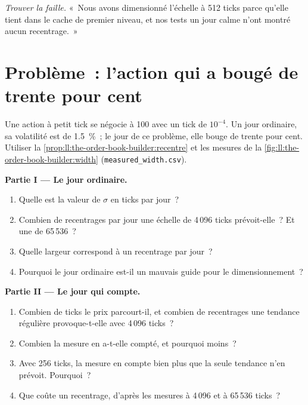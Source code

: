 \begin{exercise}[$\star\star\star$]\label{exo:ll:the-order-book-builder:8}
\emph{Trouver la faille.} «~Nous avons dimensionné l'échelle à 512 ticks parce qu'elle tient dans le cache de premier niveau, et nos tests
un jour calme n'ont montré aucun recentrage.~»
\end{exercise}

\section{Problème~: l'action qui a bougé de trente pour cent}

\begin{problem}\label{pb:ll:the-order-book-builder:1}
Une action à petit tick se négocie à 100 avec un tick de $10^{-4}$. Un jour ordinaire, sa volatilité est de 1.5~\%~; le jour de ce
problème, elle bouge de trente pour cent. Utiliser la \cref{prop:ll:the-order-book-builder:recentre} et les mesures de la
\cref{fig:ll:the-order-book-builder:width} (\texttt{measured\_width.csv}).

\medskip\noindent\textbf{Partie I --- Le jour ordinaire.}
\begin{enumerate}
\item Quelle est la valeur de $\sigma$ en ticks par jour~?
\item Combien de recentrages par jour une échelle de 4\,096 ticks prévoit-elle~? Et une de 65\,536~?
\item Quelle largeur correspond à un recentrage par jour~?
\item Pourquoi le jour ordinaire est-il un mauvais guide pour le dimensionnement~?
\end{enumerate}

\medskip\noindent\textbf{Partie II --- Le jour qui compte.}
\begin{enumerate}[resume]
\item Combien de ticks le prix parcourt-il, et combien de recentrages une tendance régulière provoque-t-elle avec 4\,096 ticks~?
\item Combien la mesure en a-t-elle compté, et pourquoi moins~?
\item Avec 256 ticks, la mesure en compte bien plus que la seule tendance n'en prévoit. Pourquoi~?
\item Que coûte un recentrage, d'après les mesures à 4\,096 et à 65\,536 ticks~?
\end{enumerate}


\end{problem}
